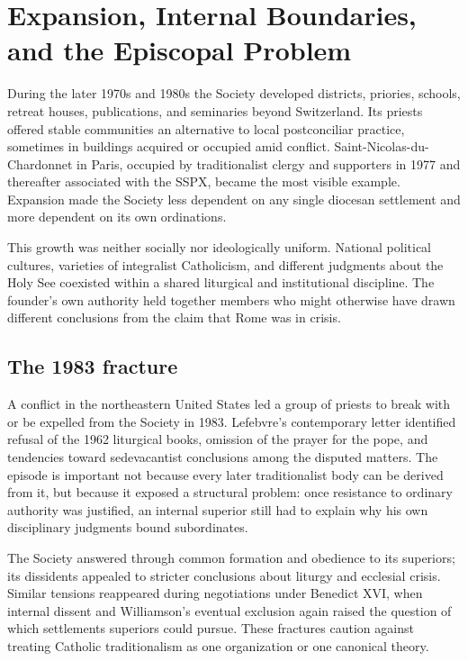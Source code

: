 \section{Expansion, Internal Boundaries, and the Episcopal Problem}

During the later 1970s and 1980s the Society developed districts, priories, schools, retreat houses, publications, and seminaries beyond Switzerland. Its priests offered stable communities an alternative to local postconciliar practice, sometimes in buildings acquired or occupied amid conflict. Saint-Nicolas-du-Chardonnet in Paris, occupied by traditionalist clergy and supporters in 1977 and thereafter associated with the SSPX, became the most visible example. Expansion made the Society less dependent on any single diocesan settlement and more dependent on its own ordinations.

This growth was neither socially nor ideologically uniform. National political cultures, varieties of integralist Catholicism, and different judgments about the Holy See coexisted within a shared liturgical and institutional discipline. The founder's own authority held together members who might otherwise have drawn different conclusions from the claim that Rome was in crisis.

\subsection{The 1983 fracture}

A conflict in the northeastern United States led a group of priests to break with or be expelled from the Society in 1983. Lefebvre's contemporary letter identified refusal of the 1962 liturgical books, omission of the prayer for the pope, and tendencies toward sedevacantist conclusions among the disputed matters. The episode is important not because every later traditionalist body can be derived from it, but because it exposed a structural problem: once resistance to ordinary authority was justified, an internal superior still had to explain why his own disciplinary judgments bound subordinates.

The Society answered through common formation and obedience to its superiors; its dissidents appealed to stricter conclusions about liturgy and ecclesial crisis. Similar tensions reappeared during negotiations under Benedict XVI, when internal dissent and Williamson's eventual exclusion again raised the question of which settlements superiors could pursue. These fractures caution against treating Catholic traditionalism as one organization or one canonical theory.

